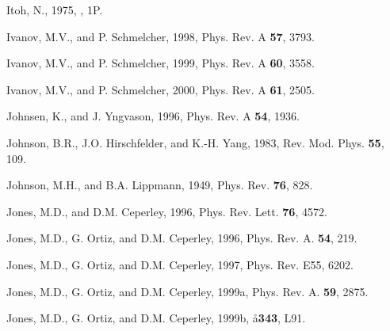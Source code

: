 \begin{references}

\harvarditem{}{}{}
Itoh, N., 1975, , 1P.

\harvarditem{}{}{}
Ivanov, M.V., and P. Schmelcher, 1998, Phys. Rev. A {\bf 57}, 3793.

\harvarditem{}{}{}
Ivanov, M.V., and P. Schmelcher, 1999, Phys. Rev. A {\bf 60}, 3558.

\harvarditem{}{}{}
Ivanov, M.V., and P. Schmelcher, 2000, Phys. Rev. A {\bf 61}, 2505.


\harvarditem{}{}{}
Johnsen, K., and J. Yngvason, 1996, Phys. Rev. A {\bf 54}, 1936.

\harvarditem{}{}{}
Johnson, B.R., J.O. Hirschfelder, and K.-H. Yang, 1983, 
Rev. Mod. Phys. {\bf 55}, 109.

\harvarditem{}{}{}
Johnson, M.H., and B.A. Lippmann, 1949, Phys. Rev. {\bf 76}, 828.

\harvarditem{}{}{}
Jones, M.D., and D.M. Ceperley, 1996, Phys. Rev. Lett. {\bf 76}, 4572.

\harvarditem{}{}{}
Jones, M.D., G. Ortiz, and D.M. Ceperley, 1996, Phys. Rev. A. {\bf 54},
219.

\harvarditem{}{}{}
Jones, M.D., G. Ortiz, and D.M. Ceperley, 1997, Phys. Rev. E55, 6202.


\harvarditem{}{}{}
Jones, M.D., G. Ortiz, and D.M. Ceperley, 1999a, Phys. Rev. A. {\bf 59},
2875.

\harvarditem{}{}{}
Jones, M.D., G. Ortiz, and D.M. Ceperley, 1999b, \aa {\bf 343}, L91.


\end{references}
